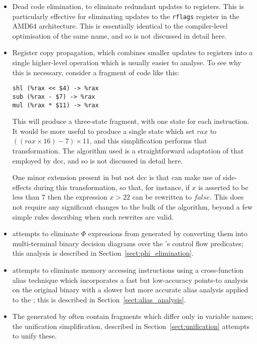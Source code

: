 \begin{itemize}
\item
  Dead code elimination, to eliminate redundant updates to registers.
  This is particularly effective for eliminating updates to the
  \verb|rflags| register in the AMD64 architecture. This is
  essentially identical to the compiler-level optimisation of the same
  name\needCite{}, and so is not discussed in detail here.
\item
  Register copy propagation, which combines smaller updates to
  registers into a single higher-level operation which is usually
  easier to analyse.  To see why this is necessary, consider
  a fragment of code like this:

\begin{verbatim}
shl (%rax << $4) -> %rax
sub (%rax - $7) -> %rax
mul (%rax * $11) -> %rax
\end{verbatim}
  
  This will produce a three-state {\StateMachine} fragment, with one
  state for each instruction.  It would be more useful to produce a
  single state which set $rax$ to $((rax \times 16) - 7) \times 11$,
  and this simplification performs that transformation.  The algorithm
  used is a straightforward adaptation of that employed by
  dcc\needCite{}, and so is not discussed in detail here.

  One minor extension present in {\implementation} but not dcc is that
  {\implementation} can make use of  side-effects during
  this transformation, so that, for instance, if $x$ is asserted to be
  less than $7$ then the expression $x > 22$ can be rewritten to
  $\mathit{false}$.  This does not require any significant changes to
  the bulk of the algorithm, beyond a few simple rules describing when
  such rewrites are valid.
\item
  {\Technique} attempts to eliminate $\Phi$ expressions from generated
  {\StateMachines} by converting them into multi-terminal binary
  decision diagrams over the {\StateMachine}'s control flow predicates;
  this analysis is described in Section~\ref{sect:phi_elimination}.
\item
  {\Technique} attempts to eliminate memory accessing instructions
  using a cross-function alias technique which incorporates a fast but
  low-accuracy points-to analysis on the original binary with a slower
  but more accurate alias analysis applied to the {\StateMachine};
  this is described in Section~\ref{sect:alias_analysis}.
\item
  The {\StateMachines} generated by {\technique} often contain
  fragments which differ only in variable names; the unification
  simplification, described in Section~\ref{sect:unification} attempts
  to unify these.
\end{itemize}

